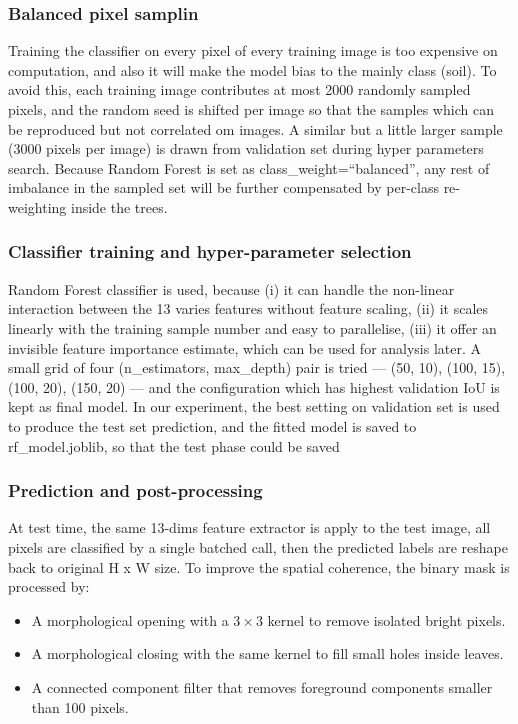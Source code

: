 \documentclass[conference]{IEEEtran}
\begin{document}
\subsubsection{Balanced pixel samplin}
Training the classifier on every pixel of every training image is too expensive on computation, and also it will make the model bias to the mainly class (soil). To avoid this, each training image contributes at most 2000 randomly sampled pixels, and the random seed is shifted per image so that the samples which can be reproduced but not correlated om images. A similar but a little larger sample (3000 pixels per image) is drawn from validation set during hyper parameters search. Because Random Forest is set as class\_weight=“balanced”, any rest of imbalance in the sampled set will be further compensated by per-class re-weighting inside the trees.
\subsubsection{Classifier training and hyper-parameter selection}
Random Forest classifier \cite{rf} is used, because (i) it can handle the non-linear interaction between the 13 varies features without feature scaling, (ii) it scales linearly with the training sample number and easy to parallelise, (iii) it offer an invisible feature importance estimate, which can be used for analysis later. A small grid of four (n\_estimators, max\_depth) pair is tried — (50, 10), (100, 15), (100, 20), (150, 20) — and the configuration which has highest validation IoU is kept as final model. In our experiment, the best setting on validation set is used to produce the test set prediction, and the fitted model is saved to rf\_model.joblib, so that the test phase could be saved
\subsubsection{Prediction and post-processing}
At test time, the same 13-dims feature extractor is apply to the test image, all pixels are classified by a single batched call, then the predicted labels are reshape back to original H x W size. To improve the spatial coherence, the binary mask is processed by:
\begin{itemize}
\item A morphological opening with a $3 \times 3$ kernel to remove isolated bright pixels.
\item A morphological closing with the same kernel to fill small holes inside leaves.
\item A connected component filter that removes foreground components smaller than 100 pixels.
\end{itemize}
\end{document}
